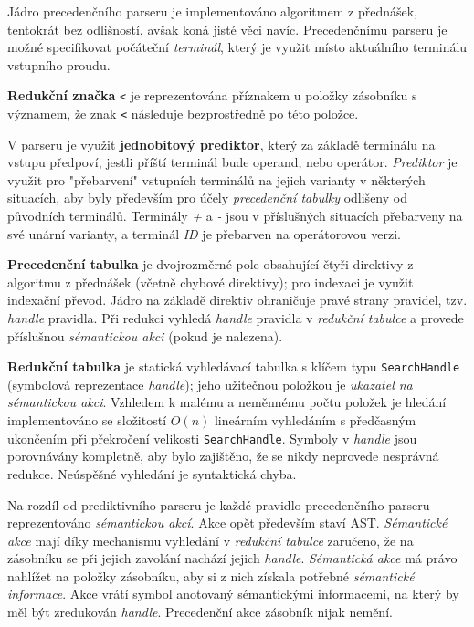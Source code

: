 \documentclass[11pt, a4paper]{article}
\begin{document}
Jádro precedenčního parseru je implementováno algoritmem z přednášek, tentokrát bez odlišností, avšak koná jisté věci navíc. Precedenčnímu parseru je možné specifikovat počáteční \emph{terminál}, který je využit místo aktuálního terminálu vstupního proudu.

\textbf{Redukční značka} \texttt{<} je reprezentována příznakem u položky zásobníku s významem, že znak \texttt{<} následuje bezprostředně po této položce.

V parseru je využit \textbf{jednobitový prediktor}, který za základě terminálu na vstupu předpoví, jestli příští terminál bude operand, nebo operátor. \emph{Prediktor} je využit pro "přebarvení" vstupních terminálů na jejich varianty v některých situacích, aby byly především pro účely \emph{precedenční tabulky} odlišeny od původních terminálů. Terminály \emph{+} a \emph{-} jsou v příslušných situacích přebarveny na své unární varianty, a terminál \emph{ID} je přebarven na operátorovou verzi.

\textbf{Precedenční tabulka} je dvojrozměrné pole obsahující čtyři direktivy z algoritmu z přednášek (včetně chybové direktivy); pro indexaci je využit indexační převod. Jádro na základě direktiv ohraničuje pravé strany pravidel, tzv. \emph{handle} pravidla. Při redukci vyhledá \emph{handle} pravidla v \emph{redukční tabulce} a provede příslušnou \emph{sémantickou akci} (pokud je nalezena).

\textbf{Redukční tabulka} je statická vyhledávací tabulka s klíčem typu \texttt{SearchHandle} (symbolová reprezentace \emph{handle}); jeho užitečnou položkou je \emph{ukazatel na sémantickou akci}. Vzhledem k malému a neměnnému počtu položek je hledání implementováno se složitostí $O(n)$ lineárním vyhledáním s předčasným ukončením při překročení velikosti \texttt{SearchHandle}. Symboly v \emph{handle} jsou porovnávány kompletně, aby bylo zajištěno, že se nikdy neprovede nesprávná redukce. Neúspěšné vyhledání je syntaktická chyba.

Na rozdíl od prediktivního parseru je každé pravidlo precedenčního parseru reprezentováno \emph{sémantickou akcí}. Akce opět především staví AST. \emph{Sémantické akce} mají díky mechanismu vyhledání v \emph{redukční tabulce} zaručeno, že na zásobníku se při jejich zavolání nachází jejich \emph{handle}. \emph{Sémantická akce} má právo nahlížet na položky zásobníku, aby si z nich získala potřebné \emph{sémantické informace}. Akce vrátí symbol anotovaný sémantickými informacemi, na který by měl být zredukován \emph{handle}. Precedenční akce zásobník nijak nemění.
\end{document}
